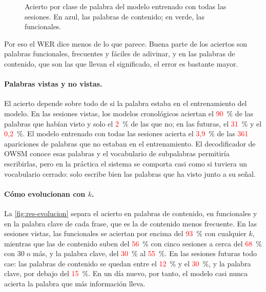 \begin{figure}[htbp]
  \centering
  \caption{Acierto por clase de palabra del modelo entrenado con todas las sesiones. En azul, las palabras de contenido; en verde, las funcionales.}
  \label{fig:res-clases}
\end{figure}

Por eso el WER dice menos de lo que parece. Buena parte de los aciertos son palabras funcionales, frecuentes y fáciles de adivinar, y en las palabras de contenido, que son las que llevan el significado, el error es bastante mayor.

\paragraph{Palabras vistas y no vistas.} El acierto depende sobre todo de si la palabra estaba en el entrenamiento del modelo. En las sesiones vistas, los modelos cronológicos aciertan el \textcolor{red}{90}~\% de las palabras que habían visto y solo el \textcolor{red}{2}~\% de las que no; en las futuras, el \textcolor{red}{31}~\% y el \textcolor{red}{0,2}~\%. El modelo entrenado con todas las sesiones acierta el \textcolor{red}{3,9}~\% de las \textcolor{red}{361} apariciones de palabras que no estaban en el entrenamiento. El decodificador de OWSM conoce esas palabras y el vocabulario de subpalabras permitiría escribirlas, pero en la práctica el sistema se comporta casi como si tuviera un vocabulario cerrado: solo escribe bien las palabras que ha visto junto a su señal.

\paragraph{Cómo evolucionan con $k$.} La \cref{fig:res-evolucion} separa el acierto en palabras de contenido, en funcionales y en la palabra clave de cada frase, que es la de contenido menos frecuente. En las sesiones vistas, las funcionales se aciertan por encima del \textcolor{red}{93}~\% con cualquier $k$, mientras que las de contenido suben del \textcolor{red}{56}~\% con cinco sesiones a cerca del \textcolor{red}{68}~\% con 30 o más, y la palabra clave, del \textcolor{red}{30}~\% al \textcolor{red}{55}~\%. En las sesiones futuras todo cae: las palabras de contenido se quedan entre el \textcolor{red}{12}~\% y el \textcolor{red}{30}~\%, y la palabra clave, por debajo del \textcolor{red}{15}~\%. En un día nuevo, por tanto, el modelo casi nunca acierta la palabra que más información lleva.

